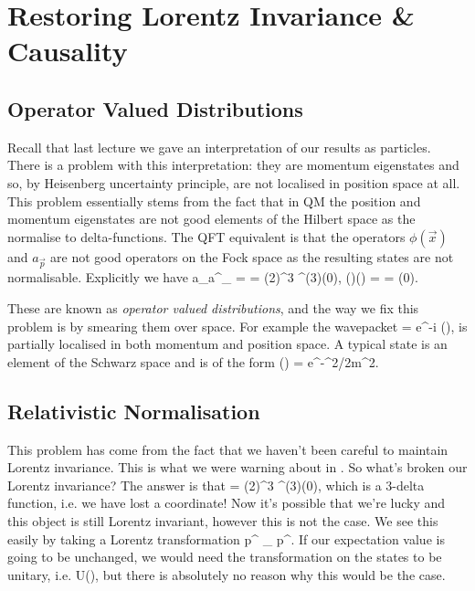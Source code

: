 \chapter{Restoring Lorentz Invariance \& Causality}

\section{Operator Valued Distributions}

Recall that last lecture we gave an interpretation of our results as particles. There is a problem with this interpretation: they are momentum eigenstates and so, by Heisenberg uncertainty principle, are not localised in position space at all. This problem essentially stems from the fact that in QM the position and momentum eigenstates are not good elements of the Hilbert space as the normalise to delta-functions. The QFT equivalent is that the operators $\phi(\vec{x})$ and $a_{\vec{p}}$ are not good operators on the Fock space as the resulting states are not normalisable. Explicitly we have 
\bse 
    a_{}a^{\dagger}_{} =  = (2\pi)^3 \del^{(3)}(0), \qand {}\phi()\phi() =  = \del(0).
\ese 

These are known as \textit{operator valued distributions}, and the way we fix this problem is by smearing them over space. For example the wavepacket 
\bse 
    \ket{\varphi} = \int {} e^{-i\cdot{}} \varphi(),
\ese 
is partially localised in both momentum and position space. A typical state is an element of the Schwarz space and is of the form 
\bse 
    \varphi() = e^{-^2/2m^2}.
\ese

\section{Relativistic Normalisation}

This problem has come from the fact that we haven't been careful to maintain Lorentz invariance. This is what we were warning about in . So what's broken our Lorentz invariance? The answer is that 
\bse 
     = (2\pi)^3 \del^{(3)}(0),
\ese 
which is a $3$-delta function, i.e. we have lost a coordinate! Now it's possible that we're lucky and this object is still Lorentz invariant, however this is not the case. We see this easily by taking a Lorentz transformation
\bse 
    p^{\mu} \longrightarrow {\Lambda^{\mu}}_{\nu} p^{\nu}.
\ese 
If our expectation value is going to be unchanged, we would need the transformation on the states to be unitary, i.e. 
\bse 
     \longrightarrow U(\Lambda),
\ese 
but there is absolutely no reason why this would be the case. 

